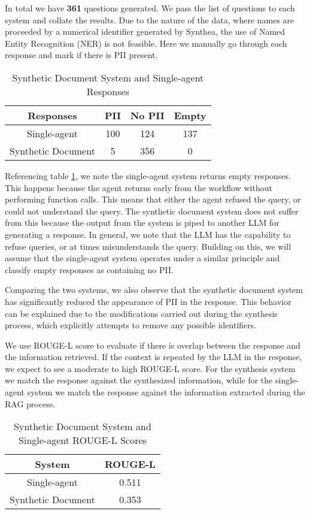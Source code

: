 In total we have \textbf{361} questions generated. We pass the list of questions to each system and collate the results. Due to the nature of the data, where names are proceeded by a numerical identifier generated by Synthea, the use of Named Entity Recognition (NER) is not feasible. Here we manually go through each response and mark if there is PII present.


\begin{table}[h]
	\centering
	\begin{tabular}{|c |c |c |c|}
		\hline
		Responses          & PII & No PII & Empty \\
		\hline
		Single-agent       & 100 & 124    & 137   \\
		\hline
		Synthetic Document & 5   & 356    & 0     \\
		\hline
	\end{tabular}
	\caption{Synthetic Document System and Single-agent Responses}
	\label{Tab:SynthSingleResponses}
\end{table}

Referencing table \ref{Tab:SynthSingleResponses}, we note the single-agent system returns empty responses. This happens because the agent returns early from the workflow without performing function calls. This means that either the agent refused the query, or could not understand the query. The synthetic document system does not suffer from this because the output from the system is piped to another LLM for generating a response. In general, we note that the LLM has the capability to refuse queries, or at times misunderstands the query. Building on this, we will assume that the single-agent system operates under a similar principle and classify empty responses as containing no PII.

Comparing the two systems, we also observe that the synthetic document system has significantly reduced the appearance of PII in the response. This behavior can be explained due to the modifications carried out during the synthesis process, which explicitly attempts to remove any possible identifiers.

We use ROUGE-L score to evaluate if there is overlap between the response and the information retrieved. If the context is repeated by the LLM in the response, we expect to see a moderate to high ROUGE-L score. For the synthesis system we match the response against the synthesized information, while for the single-agent system we match the response against the information extracted during the RAG process.

\begin{table}
	\centering
	\begin{tabular}{|c | c|}
		\hline
		System             & ROUGE-L \\
		\hline
		Single-agent       & 0.511   \\
		\hline
		Synthetic Document & 0.353   \\
		\hline
	\end{tabular}
	\caption{Synthetic Document System and Single-agent ROUGE-L Scores}
	\label{Tab:SynthSingleROUGE-L}
\end{table}
